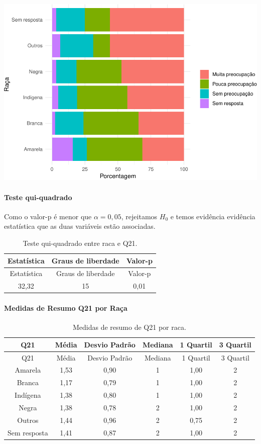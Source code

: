 \documentclass[]{article}
\let\oldparagraph\paragraph
\renewcommand{\paragraph}[1]{\oldparagraph{#1}\mbox{}}
\begin{document}
\begin{center}\includegraphics[width=0.75\linewidth]{relatorio_files/figure-latex/unnamed-chunk-348-1} \end{center}

\hypertarget{teste-qui-quadrado-40}{%
\paragraph{Teste qui-quadrado}\label{teste-qui-quadrado-40}}

Como o valor-p é menor que \(\alpha=0,05\), rejeitamos \(H_0\) e temos evidência evidência estatística que as duas variáveis estão associadas.

\begin{longtable}[]{@{}ccc@{}}
\caption{\label{tab:unnamed-chunk-349}Teste qui-quadrado entre raca e Q21.}\tabularnewline
\toprule
Estatística & Graus de liberdade & Valor-p\tabularnewline
\midrule
\endfirsthead
\toprule
Estatística & Graus de liberdade & Valor-p\tabularnewline
\midrule
\endhead
32,32 & 15 & 0,01\tabularnewline
\bottomrule
\end{longtable}

\cleardoublepage

\hypertarget{medidas-de-resumo-q21-por-rauxe7a}{%
\paragraph{Medidas de Resumo Q21 por Raça}\label{medidas-de-resumo-q21-por-rauxe7a}}

\begin{longtable}[]{@{}cccccc@{}}
\caption{\label{tab:unnamed-chunk-350}Medidas de resumo de Q21 por raca.}\tabularnewline
\toprule
Q21 & Média & Desvio Padrão & Mediana & 1 Quartil & 3 Quartil\tabularnewline
\midrule
\endfirsthead
\toprule
Q21 & Média & Desvio Padrão & Mediana & 1 Quartil & 3 Quartil\tabularnewline
\midrule
\endhead
Amarela & 1,53 & 0,90 & 1 & 1,00 & 2\tabularnewline
Branca & 1,17 & 0,79 & 1 & 1,00 & 2\tabularnewline
Indígena & 1,38 & 0,80 & 1 & 1,00 & 2\tabularnewline
Negra & 1,38 & 0,78 & 2 & 1,00 & 2\tabularnewline
Outros & 1,44 & 0,96 & 2 & 0,75 & 2\tabularnewline
Sem resposta & 1,41 & 0,87 & 2 & 1,00 & 2\tabularnewline
\bottomrule
\end{longtable}
\end{document}
